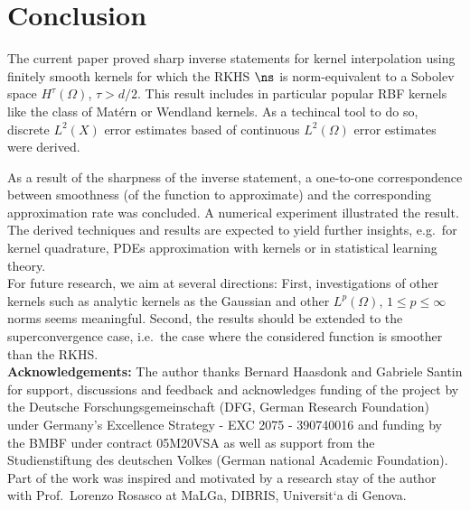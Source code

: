 \documentclass[a4paper, 10pt]{article}
\begin{document}
\section{Conclusion} \label{sec:conclusion}

The current paper proved sharp inverse statements for kernel interpolation using finitely smooth kernels for which the RKHS $\ns$ is norm-equivalent to a Sobolev space $H^\tau(\Omega)$, $\tau > d/2$.
This result includes in particular popular RBF kernels like the class of Matérn or Wendland kernels.
As a techincal tool to do so, discrete $L^2(X)$ error estimates based of continuous $L^2(\Omega)$ error estimates were derived.

%
%
As a result of the sharpness of the inverse statement, 
a one-to-one correspondence between smoothness (of the function to approximate) and the corresponding approximation rate was concluded. %
A numerical experiment illustrated the result.
The derived techniques and results are expected to yield further insights, e.g.\ for kernel quadrature, PDEs approximation with kernels or in statistical learning theory. \\
For future research, we aim at several directions:
First, investigations of other kernels such as analytic kernels as the Gaussian and other $L^p(\Omega)$, $1 \leq p \leq \infty$ norms seems meaningful.
Second, the results should be extended to the superconvergence case, i.e.\ the case where the considered function is smoother than the RKHS. \\


\textbf{Acknowledgements:}
The author thanks Bernard Haasdonk and Gabriele Santin for support, discussions and feedback
and acknowledges funding of the project by the Deutsche Forschungsgemeinschaft (DFG, German Research Foundation) under Germany's Excellence Strategy - EXC 2075 - 390740016 and funding by the BMBF under contract 05M20VSA as well as support from the Studienstiftung des deutschen Volkes (German national Academic Foundation).
Part of the work was inspired and motivated by a research stay of the author with Prof.\ Lorenzo Rosasco at MaLGa, DIBRIS, Universit`a di Genova.
 
 
 

 
 
 
\appendix 
\end{document}
